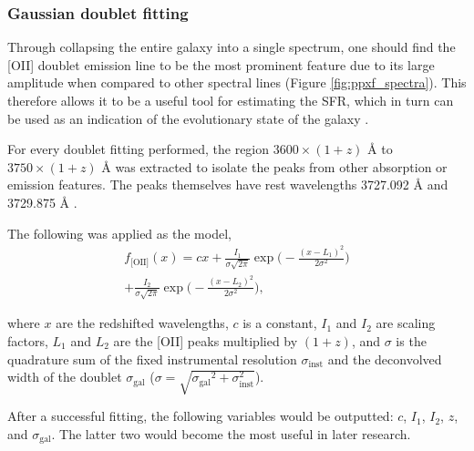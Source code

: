 \documentclass[12pt, twocolumn]{revtex4-1}    %
\begin{document}



\subsubsection{Gaussian doublet fitting}

Through collapsing the entire galaxy into a single spectrum, one should find the [OII] doublet emission line to be the most prominent feature due to its large amplitude when compared to other spectral lines (Figure \ref{fig:ppxf_spectra}). This therefore allows it to be a useful tool for estimating the SFR, which in turn can be used as an indication of the evolutionary state of the galaxy \citep{maddox_oxygen}.

For every doublet fitting performed, the region $3600\times(1+z)$ {\AA} to $3750\times(1+z)$ {\AA} was extracted to isolate the peaks from other absorption or emission features. The peaks themselves have rest wavelengths 3727.092 {\AA} and 3729.875 {\AA} \citep{sdss_lines}. 

The following was applied as the model,
\begin{multline}
f_{\text{[OII]}}(x) = cx + \frac{I_1}{\sigma \sqrt{2\pi}} \exp{\Bigg(-\frac{(x-L_1)^2}{2\sigma^2}\Bigg)} \\
+ \frac{I_2}{\sigma \sqrt{2\pi}} \exp{\Bigg(-\frac{(x-L_2)^2}{2\sigma^2}\Bigg)},
\label{eqn:doublet}
\end{multline} 

where $x$ are the redshifted wavelengths, ${c}$ is a constant, ${I_1}$ and ${I_2}$ are scaling factors, $L_1$ and $L_2$ are the [OII] peaks multiplied by $(1+{z})$, and $\sigma$ is the quadrature sum of the fixed instrumental resolution $\sigma_{\text{inst}}$ and the deconvolved width of the doublet $\sigma_{\text{gal}}$ ($\sigma=\sqrt{{\sigma_{\text{gal}}}^2 + \sigma_{\text{inst}}^2}$).



After a successful fitting, the following variables would be outputted: $c$, $I_1$, $I_2$, $z$, and $\sigma_{\text{gal}}$. The latter two would become the most useful in later research. 
\end{document}
